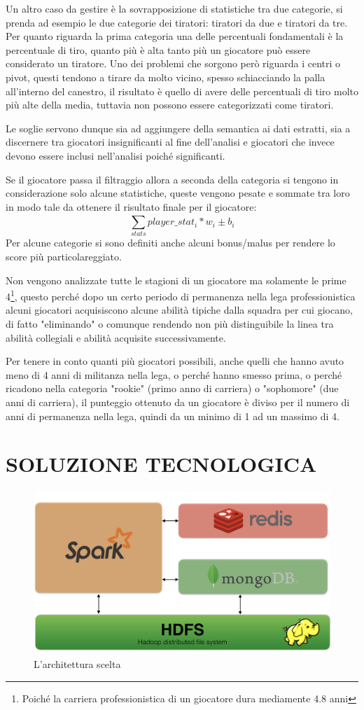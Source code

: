 \documentclass[10pt,a4paper,twocolumn]{article}
\begin{document}
Un altro caso da gestire è la sovrapposizione di statistiche tra due categorie, si prenda ad esempio le due categorie dei tiratori: tiratori da due e tiratori da tre. Per quanto riguarda la prima categoria una delle percentuali fondamentali è la percentuale di tiro, quanto più è alta tanto più un giocatore può essere considerato un tiratore. Uno dei problemi che sorgono però riguarda i centri o pivot, questi tendono a tirare da molto vicino, spesso schiacciando la palla all'interno del canestro, il risultato è quello di avere delle percentuali di tiro molto più alte della media, tuttavia non possono essere categorizzati come tiratori.

Le soglie servono dunque sia ad aggiungere della semantica ai dati estratti, sia a discernere tra giocatori insignificanti al fine dell'analisi e giocatori che invece devono essere inclusi nell'analisi poiché significanti.

Se il giocatore passa il filtraggio allora a seconda della categoria si tengono in considerazione solo alcune statistiche, queste vengono pesate e sommate tra loro in modo tale da ottenere il risultato finale per il giocatore: \[\sum_{stats}^{} player\_stat_{i} * w_{i} \pm b_{i}\] Per alcune categorie si sono definiti anche alcuni bonus/malus per rendere lo score più particolareggiato.

Non vengono analizzate tutte le stagioni di un giocatore ma solamente le prime 4\footnote{Poiché la carriera professionistica di un giocatore dura mediamente 4.8 anni}, questo perché dopo un certo periodo di permanenza nella lega professionistica alcuni giocatori acquisiscono alcune abilità tipiche dalla squadra per cui giocano, di fatto "eliminando" o comunque rendendo non più distinguibile la linea tra abilità collegiali e abilità acquisite successivamente.

Per tenere in conto quanti più giocatori possibili, anche quelli che hanno avuto meno di 4 anni di militanza nella lega, o perché hanno smesso prima, o perché ricadono nella categoria "rookie" (primo anno di carriera) o "sophomore" (due anni di carriera), il punteggio ottenuto da un giocatore è diviso per il numero di anni di permanenza nella lega, quindi da un minimo di 1 ad un massimo di 4.

\section{SOLUZIONE TECNOLOGICA}

\begin{figure}[h]
	\centering
	\includegraphics[width=0.7\linewidth]{arch}
	\caption{L'architettura scelta}
	\label{fig:arch}
\end{figure}
\end{document}
